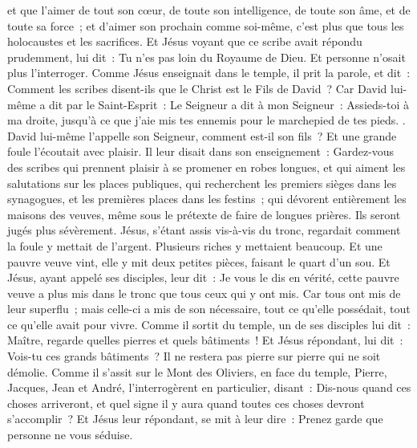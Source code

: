 \begin{multicols}{2}
et que l'aimer de tout son cœur, de toute son intelligence, de toute son âme, et de toute sa force~; et d'aimer son prochain comme soi-même, c'est plus que tous les holocaustes et les sacrifices.
Et Jésus voyant que ce scribe avait répondu prudemment, lui dit~: Tu n'es pas loin du Royaume de Dieu. Et personne n'osait plus l'interroger.
Comme Jésus enseignait dans le temple, il prit la parole, et dit~: Comment les scribes disent-ils que le Christ est le Fils de David~?
Car David lui-même a dit par le Saint-Esprit~: Le Seigneur a dit à mon Seigneur~: Assieds-toi à ma droite, jusqu’à ce que j'aie mis tes ennemis pour le marchepied de tes pieds.
.
David lui-même l'appelle son Seigneur, comment est-il son fils~? Et une grande foule l'écoutait avec plaisir.
Il leur disait dans son enseignement~: Gardez-vous des scribes qui prennent plaisir à se promener en robes longues, et qui aiment les salutations sur les places publiques,
qui recherchent les premiers sièges dans les synagogues, et les premières places dans les festins~;
qui dévorent entièrement les maisons des veuves, même sous le prétexte de faire de longues prières. Ils seront jugés plus sévèrement.
Jésus, s'étant assis vis-à-vis du tronc, regardait comment la foule y mettait de l'argent. Plusieurs riches y mettaient beaucoup.
Et une pauvre veuve vint, elle y mit deux petites pièces, faisant le quart d'un sou.
Et Jésus, ayant appelé ses disciples, leur dit~: Je vous le dis en vérité, cette pauvre veuve a plus mis dans le tronc que tous ceux qui y ont mis.
Car tous ont mis de leur superflu~; mais celle-ci a mis de son nécessaire, tout ce qu'elle possédait, tout ce qu'elle avait pour vivre.
\VerseOne{}Comme il sortit du temple, un de ses disciples lui dit~: Maître, regarde quelles pierres et quels bâtiments~!
Et Jésus répondant, lui dit~: Vois-tu ces grands bâtiments~? Il ne restera pas pierre sur pierre qui ne soit démolie.
Comme il s'assit sur le Mont des Oliviers, en face du temple, Pierre, Jacques, Jean et André, l'interrogèrent en particulier,
disant~: Dis-nous quand ces choses arriveront, et quel signe il y aura quand toutes ces choses devront s'accomplir~?
Et Jésus leur répondant, se mit à leur dire~: Prenez garde que personne ne vous séduise.

\end{multicols}
